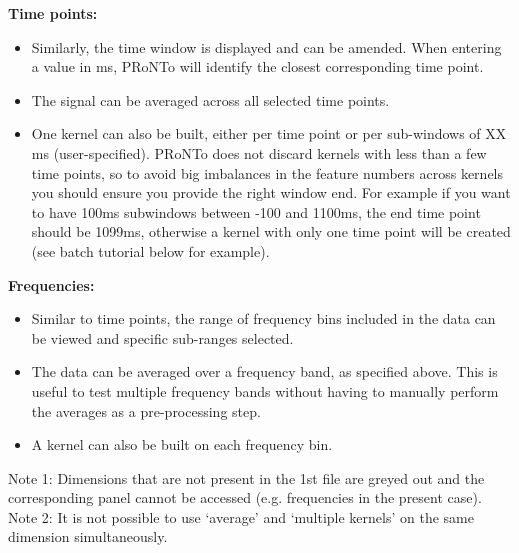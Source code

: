 \noindent \textbf{Time points:}

\begin{itemize}
\item Similarly, the time window is displayed and can be amended. When entering a value in ms, PRoNTo will identify the closest corresponding time point.

\item The signal can be averaged across all selected time points.

\item One kernel can also be built, either per time point or per sub-windows of XX ms (user-specified). PRoNTo does not discard kernels with less than a few time points, so to avoid big imbalances in the feature numbers across kernels you should ensure you provide the right window end. For example if you want to have 100ms subwindows between -100 and 1100ms, the end time point should be 1099ms, otherwise a kernel with only one time point will be created (see batch tutorial below for example).
\end{itemize}

\noindent \textbf{Frequencies:}

\begin{itemize}

\item Similar to time points, the range of frequency bins included in the data can be viewed and specific sub-ranges selected.

\item The data can be averaged over a frequency band, as specified above. This is useful to test multiple frequency bands without having to manually perform the averages as a pre-processing step.

\item A kernel can also be built on each frequency bin.
\end{itemize}

\noindent Note 1: Dimensions that are not present in the 1st file are greyed out and the corresponding panel cannot be accessed (e.g. frequencies in the present case).
\\
Note 2: It is not possible to use `average' and `multiple kernels' on the same dimension simultaneously.


